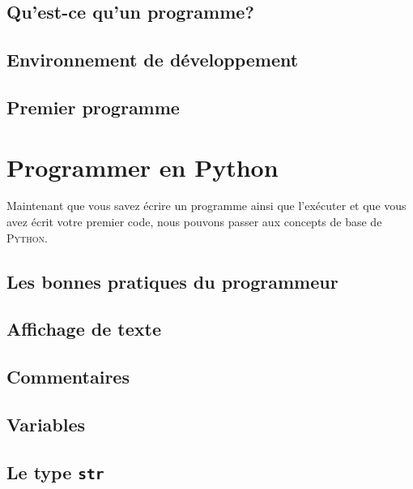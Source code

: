 \documentclass[12pt,a4paper,oneside]{report}
\begin{document}
\section{Qu'est-ce qu'un programme?}


\section{Environnement de développement}


\section{Premier programme}









\chapter{Programmer en Python}
Maintenant que vous savez écrire un programme ainsi que l'exécuter et que vous avez écrit votre premier code, nous pouvons passer aux concepts de base de \textsc{Python}.

\section{Les bonnes pratiques du programmeur}


\section{Affichage de texte}


\section{Commentaires}


\section{Variables}
\label{variables}


\section{Le type \texttt{str}}

\end{document}
